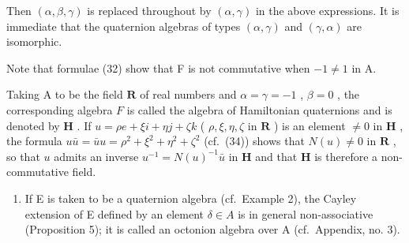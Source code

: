 Then \((\alpha, \beta, \gamma)\) is replaced throughout by \((\alpha, \gamma)\) in the above expressions. It is immediate that the quaternion algebras of types \((\alpha, \gamma)\) and \((\gamma, \alpha)\) are isomorphic.

Note that formulae (32) show that F is not commutative when \(-1 \neq 1\) in A.

Taking A to be the field \(\mathbf{R}\) of real numbers and \(\alpha = \gamma = -1\) , \(\beta = 0\) , the corresponding algebra \(F\) is called the algebra of Hamiltonian quaternions and is denoted by \(\mathbf{H}\) . If \(u = \rho e + \xi i + \eta j + \zeta k\) ( \(\rho, \xi, \eta, \zeta\) in \(\mathbf{R}\) ) is an element \(\neq 0\) in \(\mathbf{H}\) , the formula \(u\bar{u} = \bar{u} u = \rho^2 + \xi^2 + \eta^2 + \zeta^2\) (cf.~(34)) shows that \(N(u) \neq 0\) in \(\mathbf{R}\) , so that \(u\) admits an inverse \(u^{-1} = N(u)^{-1}\bar{u}\) in \(\mathbf{H}\) and that \(\mathbf{H}\) is therefore a non-commutative field.

\begin{enumerate}
\def\labelenumi{(\arabic{enumi})}
\setcounter{enumi}{2}
\tightlist
\item
  If E is taken to be a quaternion algebra (cf.~Example 2), the Cayley extension of E defined by an element \(\delta \in A\) is in general non-associative (Proposition 5); it is called an octonion algebra over A (cf.~Appendix, no. 3).
\end{enumerate}

